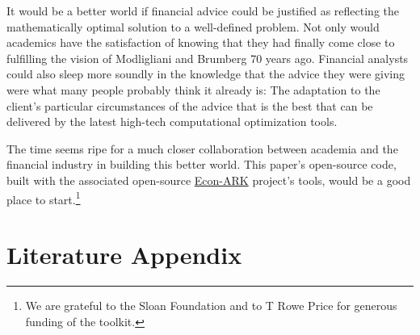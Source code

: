 \documentclass{article}
\begin{document}
It would be a better world if financial advice could be justified as reflecting the mathematically optimal solution to a well-defined problem.
Not only would academics have the satisfaction of knowing that they had finally come close to fulfilling the vision of Modligliani and Brumberg 70 years ago.
Financial analysts could also sleep more soundly in the knowledge that the advice they were giving were what many people probably think it already is: The adaptation to the client's particular circumstances of the advice that is the best that can be delivered by the latest high-tech computational optimization tools.

The time seems ripe for a much closer collaboration between academia and the financial industry in building this better world.  This paper's open-source code, built with the associated open-source \href{https://econ-ark.org}{Econ-ARK} project's tools, would be a good place to start.\footnote{We are grateful to the Sloan Foundation and to T Rowe Price for generous funding of the toolkit.}

\section{Literature Appendix}\label{lit-review}
\end{document}
